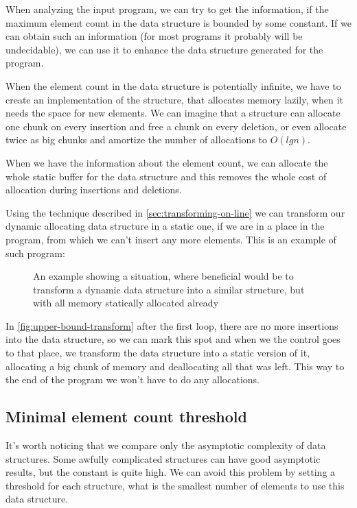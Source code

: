 \documentclass[a4paper,11pt]{article}
\begin{document}
		When analyzing the input program, we can try to get the information, if the maximum element count in the
		data structure is bounded by some constant. If we can obtain such an information (for most programs it
		probably will be undecidable), we can use it to enhance the data structure generated for the program.

		When the element count in the data structure is potentially infinite, we have to create an
		implementation of the structure, that allocates memory lazily, when it needs the space for new elements.
		We can imagine that a structure can allocate one chunk on every insertion and free a chunk on every
		deletion, or even allocate twice as big chunks and amortize the number of allocations to $O(lg n)$.

		When we have the information about the element count, we can allocate the whole static buffer for the
		data structure and this removes the whole cost of allocation during insertions and deletions.

		Using the technique described in \autoref{sec:transforming-on-line} we can transform our dynamic
		allocating data structure in a static one, if we are in a place in the program, from which we can't
		insert any more elements. This is an example of such program:

		\begin{figure}
			

			\caption{An example showing a situation, where beneficial would be to transform a dynamic data
			structure into a similar structure, but with all memory statically allocated already}

			\label{fig:upper-bound-transform}
		\end{figure}

		In \autoref{fig:upper-bound-transform} after the first loop, there are no more insertions into the data
		structure, so we can mark this spot and when we the control goes to that place, we transform the data
		structure into a static version of it, allocating a big chunk of memory and deallocating all that was
		left. This way to the end of the program we won't have to do any allocations.

	\subsection{Minimal element count threshold}

		It's worth noticing that we compare only the asymptotic complexity of data structures. Some awfully
		complicated structures can have good asymptotic results, but the constant is quite high. We can avoid
		this problem by setting a threshold for each structure, what is the smallest number of elements to use
		this data structure.
\end{document}
